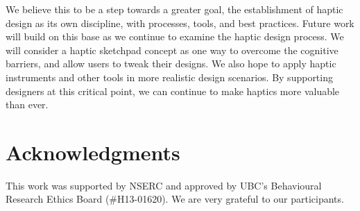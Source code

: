 We believe this to be a step towards a greater goal, the establishment of haptic design as its own discipline, with processes, tools, and best practices.
Future work will build on this base as we continue to examine the haptic design process. %
We will consider a haptic sketchpad concept as one way to overcome the cognitive barriers, and allow users to tweak their designs.
We also hope to apply haptic instruments and other tools in more realistic design scenarios.
By supporting designers at this critical point, we can continue to make haptics more valuable than ever.



%
% 
\section{Acknowledgments}

This work was supported by NSERC
and approved by UBC's Behavioural Research Ethics Board (\#H13-01620).
We are very grateful to our participants.



\endinput
